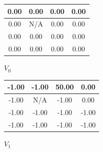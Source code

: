 \documentclass{article}
\begin{document}
\begin{figure}[H]
    \centering
    \begin{minipage}{0.3\textwidth}
        \centering
        \begin{tabular}{|c|c|c|c|}
        \hline
        0.00 & 0.00 & 0.00 & 0.00 \\
        \hline
        0.00 & N/A & 0.00 & 0.00 \\
        \hline
        0.00 & 0.00 & 0.00 & 0.00 \\
        \hline
        0.00 & 0.00 & 0.00 & 0.00 \\
        \hline
        \end{tabular}
        \vspace{0.5em}
        \small $V_0$
    \end{minipage}
    \hfill
    \begin{minipage}{0.3\textwidth}
        \centering
        \begin{tabular}{|c|c|c|c|}
        \hline
        -1.00 & -1.00 & 50.00 & 0.00 \\
        \hline
        -1.00 & N/A & -1.00 & 0.00 \\
        \hline
        -1.00 & -1.00 & -1.00 & -1.00 \\
        \hline
        -1.00 & -1.00 & -1.00 & -1.00 \\
        \hline
        \end{tabular}
        \vspace{0.5em}
        \small $V_1$
    \end{minipage}
    \end{figure}
\end{document}
